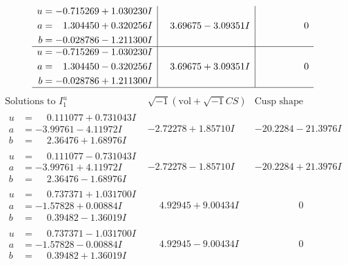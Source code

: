 \documentclass[1p]{elsarticle_modified}
\theoremstyle{definition}
\newcommand{\I}{\sqrt{-1}}
\begin{document}
$$\begin{array}{c|c|c}
\begin{aligned}
u &= -0.715269 + 1.030230 I \\
a &= \phantom{-}1.304450 + 0.320256 I \\
b &= -0.028786 - 1.211300 I\end{aligned}
 & \phantom{-}3.69675 - 3.09351 I & \phantom{-0.000000 } 0 \\ \hline\begin{aligned}
u &= -0.715269 - 1.030230 I \\
a &= \phantom{-}1.304450 - 0.320256 I \\
b &= -0.028786 + 1.211300 I\end{aligned}
 & \phantom{-}3.69675 + 3.09351 I & \phantom{-0.000000 } 0\\
 \hline 
 \end{array}$$\newpage$$\begin{array}{c|c|c}  
\text{Solutions to }I^u_{1}& \I (\text{vol} + \sqrt{-1}CS) & \text{Cusp shape}\\
 \hline 
\begin{aligned}
u &= \phantom{-}0.111077 + 0.731043 I \\
a &= -3.99761 - 4.11972 I \\
b &= \phantom{-}2.36476 + 1.68976 I\end{aligned}
 & -2.72278 + 1.85710 I & -20.2284 - 21.3976 I \\ \hline\begin{aligned}
u &= \phantom{-}0.111077 - 0.731043 I \\
a &= -3.99761 + 4.11972 I \\
b &= \phantom{-}2.36476 - 1.68976 I\end{aligned}
 & -2.72278 - 1.85710 I & -20.2284 + 21.3976 I \\ \hline\begin{aligned}
u &= \phantom{-}0.737371 + 1.031700 I \\
a &= -1.57828 + 0.00884 I \\
b &= \phantom{-}0.39482 - 1.36019 I\end{aligned}
 & \phantom{-}4.92945 + 9.00434 I & \phantom{-0.000000 } 0 \\ \hline\begin{aligned}
u &= \phantom{-}0.737371 - 1.031700 I \\
a &= -1.57828 - 0.00884 I \\
b &= \phantom{-}0.39482 + 1.36019 I\end{aligned}
 & \phantom{-}4.92945 - 9.00434 I & \phantom{-0.000000 } 0 \\ \hline\begin{aligned}

\end{aligned}
\end{array}$$
\end{document}
